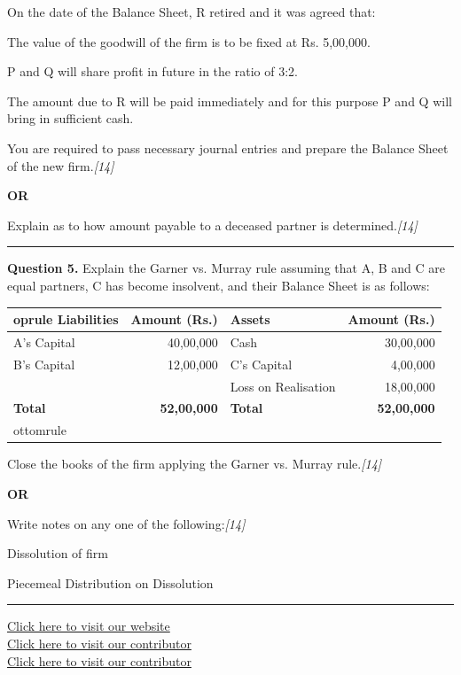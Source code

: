 \documentclass[11pt,a4paper]{article}
\newcommand{\pts}[1]{\hfill   \textit{[#1]}}
\begin{document}
On the date of the Balance Sheet, R retired and it was agreed that:

\begin{parts}
  \item The value of the goodwill of the firm is to be fixed at Rs. 5,00,000.
  \item P and Q will share profit in future in the ratio of 3:2.
  \item The amount due to R will be paid immediately and for this purpose P and Q will bring in sufficient cash.
\end{parts}
You are required to pass necessary journal entries and prepare the Balance Sheet of the new firm.\pts{14}

\centerline{   \textbf{OR}}

Explain as to how amount payable to a deceased partner is determined.\pts{14}

\medskip\rule{\linewidth}{0.2pt}


\newpage




\noindent   \textbf{Question 5.}
Explain the Garner vs. Murray rule assuming that A, B and C are equal partners, C has become insolvent, and their Balance Sheet is as follows:

\begin{center}
  \small
  
\begin{tabular}{lr|lr}
     oprule
   \textbf{Liabilities} &   \textbf{Amount (Rs.)} &   \textbf{Assets} &   \textbf{Amount (Rs.)} \\
    \midrule
    A's Capital & 40,00,000 & Cash & 30,00,000 \\
    B's Capital & 12,00,000 & C's Capital & 4,00,000 \\
                &           & Loss on Realisation & 18,00,000 \\
    \midrule
   \textbf{Total} &   \textbf{52,00,000} &   \textbf{Total} &   \textbf{52,00,000} \\
    ottomrule
  \end{tabular}
\end{center}
Close the books of the firm applying the Garner vs. Murray rule.\pts{14}

\centerline{   \textbf{OR}}

Write notes on any one of the following:\pts{14}

\begin{parts}
  \item Dissolution of firm
  \item Piecemeal Distribution on Dissolution
\end{parts}

\vfill
\rule{\linewidth}{0.4pt}

\begin{center}\small
\href{https://bhu-exam.vercel.app/}{Click here to visit our website}\\[4pt]
\href{https://me-aryan.vercel.app/}{Click here to visit our contributor}\\[4pt]
\href{https://quashan-me.vercel.app/}{Click here to visit our contributor}
\end{center}
\end{document}

